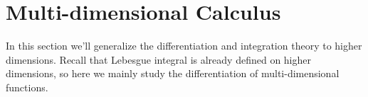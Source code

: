 \section{Multi-dimensional Calculus}
\label{sec:Multi-dimensional Calculus}

In this section we'll generalize the differentiation and integration theory
to higher dimensions. Recall that Lebesgue integral is already
defined on higher dimensions, so here we mainly study the differentiation
of multi-dimensional functions.

